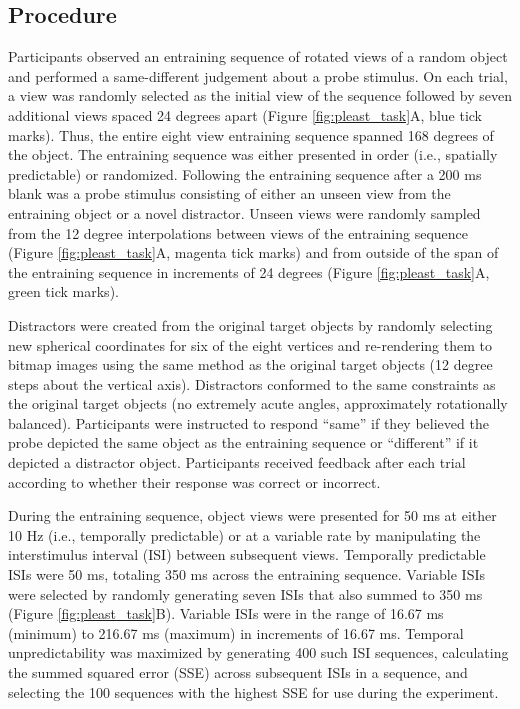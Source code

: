 \documentclass[dwyatte_dissertation.tex]{subfiles}
\begin{document}
\subsection{Procedure}
Participants observed an entraining sequence of rotated views of a random object and performed a same-different judgement about a probe stimulus. On each trial, a view was randomly selected as the initial view of the sequence followed by seven additional views spaced 24 degrees apart (Figure \ref{fig:pleast_task}A, blue tick marks). Thus, the entire eight view entraining sequence spanned 168 degrees of the object. The entraining sequence was either presented in order (i.e., spatially predictable) or randomized. Following the entraining sequence after a 200 ms blank was a probe stimulus consisting of either an unseen view from the entraining object or a novel distractor. Unseen views were randomly sampled from the 12 degree interpolations between views of the entraining sequence (Figure \ref{fig:pleast_task}A, magenta tick marks) and from outside of the span of the entraining sequence in increments of 24 degrees (Figure \ref{fig:pleast_task}A, green tick marks).

Distractors were created from the original target objects by randomly selecting new spherical coordinates for six of the eight vertices and re-rendering them to bitmap images using the same method as the original target objects (12 degree steps about the vertical axis). Distractors conformed to the same constraints as the original target objects (no extremely acute angles, approximately rotationally balanced). Participants were instructed to respond ``same'' if they believed the probe depicted the same object as the entraining sequence or ``different'' if it depicted a distractor object. Participants received feedback after each trial according to whether their response was correct or incorrect. %

During the entraining sequence, object views were presented for 50 ms at either 10 Hz (i.e., temporally predictable) or at a variable rate by manipulating the interstimulus interval (ISI) between subsequent views. Temporally predictable ISIs were 50 ms, totaling 350 ms across the entraining sequence. Variable ISIs were selected by randomly generating seven ISIs that also summed to 350 ms (Figure \ref{fig:pleast_task}B). Variable ISIs were in the range of 16.67 ms (minimum) to 216.67 ms (maximum) in increments of 16.67 ms. Temporal unpredictability was maximized by generating 400 such ISI sequences, calculating the summed squared error (SSE) across subsequent ISIs in a sequence, and selecting the 100 sequences with the highest SSE for use during the experiment.
\end{document}
